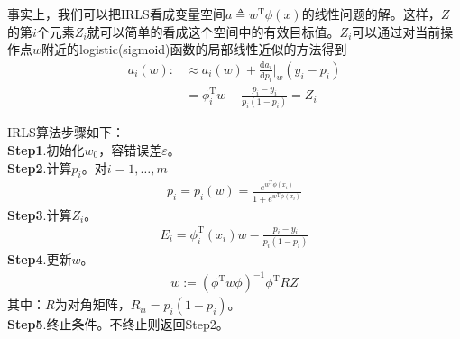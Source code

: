             \par
            事实上，我们可以把IRLS看成变量空间$a \triangleq w^\mathrm{T}\phi(x)$的线性问题的解。这样，$Z$的第$i$个元素$Z_i$就可以简单的看成这个空间中的有效目标值。$Z_i$可以通过对当前操作点$w$附近的logistic(sigmoid)函数的局部线性近似的方法得到
            \begin{align*}
            a_i(w) :&\approx a_i(w) + \frac{\mathrm{d}a_i}{\mathrm{d}p_i} \biggl|_w(y_i-p_i) \\
            &= \phi_i^\mathrm{T}w - \frac{p_i-y_i}{p_i(1-p_i)} = Z_i
            \end{align*}
            \par
            IRLS算法步骤如下：\\
            \textbf{Step1}.初始化$w_0$，容错误差$\varepsilon$。\\
            \textbf{Step2}.计算$p_i$。对$i = 1,\dots,m$
            \begin{align*}
            p_i = p_i(w) = \frac{e^{w^\mathrm{T}\phi(x_i)}}{1+e^{w^\mathrm{T}\phi(x_i)}}
            \end{align*}
            \textbf{Step3}.计算$Z_i$。
            \begin{align*}
            E_i = \phi_i^\mathrm{T}(x_i)w - \frac{p_i-y_i}{p_i(1-p_i)}
            \end{align*}
            \textbf{Step4}.更新$w$。
            \begin{align*}
            w:=(\phi^\mathrm{T}w\phi)^{-1}\phi^\mathrm{T}RZ
            \end{align*}
            其中：$R$为对角矩阵，$R_{ii} = p_i(1-p_i)$。\\
            \textbf{Step5}.终止条件。不终止则返回Step2。
